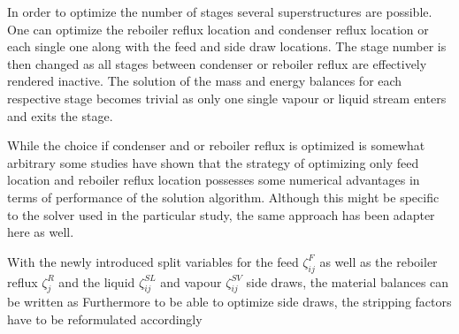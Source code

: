         In order to optimize the number of stages several superstructures are possible. One can
        optimize the reboiler reflux location and condenser reflux location or each single one
        along with the feed and side draw locations. The stage number is then changed as all stages
        between condenser or reboiler reflux are effectively rendered inactive. The solution of
        the mass and energy balances for each respective stage becomes trivial as only one single
        vapour or liquid stream enters and exits the stage. 
         
        While the choice if condenser and or reboiler
        reflux is optimized is somewhat arbitrary some studies have shown \cite{Grossmann.2005} that
        the strategy of optimizing only feed location and reboiler reflux location possesses some
        numerical advantages in terms of performance of the solution algorithm. Although this might be
        specific to the solver used in the particular study, the same approach has been adapter here as well. 

        With the newly introduced split variables for the feed $\zeta^F_{ij}$ 
        as well as the reboiler reflux $\zeta^R_j$ and the liquid $\zeta^{SL}_{ij}$ and vapour $\zeta^{SV}_{ij}$
        side draws, the material balances can be written as
        Furthermore to be able to optimize side draws, the stripping factors have to be reformulated
        accordingly
